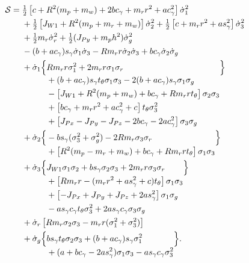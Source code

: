 \begin{align}
\mathcal S={}&\tfrac12\left[c+R^2(m_p+m_w)+2bc_\gamma+m_rr^2+ac_\gamma^2\right]\dot\sigma_1^2\\
&+\tfrac12\left[J_{W1}+R^2(m_p+m_r+m_w)\right]\dot\sigma_2^2
+\tfrac12\left[c+m_rr^2+as_\gamma^2\right]\dot\sigma_3^2\\
&+\tfrac12m_r\dot\sigma_r^2
+\tfrac12(J_{Py}+m_ph^2)\dot\sigma_g^2\\
&-(b+ac_\gamma)s_\gamma\dot\sigma_1\dot\sigma_3
-Rm_rr\dot\sigma_2\dot\sigma_3
+bc_\gamma\dot\sigma_2\dot\sigma_g\notag\\
&+\dot\sigma_1\Bigl\{\begin{aligned}[t]
&Rm_rr\sigma_1^2+2m_rr\sigma_1\sigma_r\\
&+(b+ac_\gamma)s_\gamma t_\theta\sigma_1\sigma_3
-2(b+ac_\gamma)s_\gamma\sigma_1\sigma_g\\
&-\left[J_{W1}+R^2(m_p+m_w)+bc_\gamma+Rm_rrt_\theta\right]\sigma_2\sigma_3\\
&+\left[bc_\gamma+m_rr^2+ac_\gamma^2+c\right]t_\theta\sigma_3^2\\
&+\left[J_{Px}-J_{Py}-J_{Pz}-2bc_\gamma-2ac_\gamma^2\right]\sigma_3\sigma_g
\end{aligned}\Bigr\}\notag\\
&+\dot\sigma_2\Bigl\{\begin{aligned}[t]
&-bs_\gamma(\sigma_3^2+\sigma_g^2)-2Rm_r\sigma_3\sigma_r\\
&+\left[R^2(m_p-m_r+m_w)+bc_\gamma+Rm_rrt_\theta\right]\sigma_1\sigma_3
\end{aligned}\Bigr\}\notag\\
&+\dot\sigma_3\Bigl\{\begin{aligned}[t]
&J_{W1}\sigma_1\sigma_2+bs_\gamma\sigma_2\sigma_3
+2m_rr\sigma_3\sigma_r\\
&+\left[Rm_rr-(m_rr^2+as_\gamma^2+c)t_\theta\right]\sigma_1\sigma_3\\
&+\left[-J_{Px}+J_{Py}+J_{Pz}+2as_\gamma^2\right]\sigma_1\sigma_g\\
&-as_\gamma c_\gamma t_\theta\sigma_3^2
+2as_\gamma c_\gamma\sigma_3\sigma_g
\end{aligned}\Bigr\}\notag\\
&+\dot\sigma_r\left[Rm_r\sigma_2\sigma_3-m_rr(\sigma_1^2+\sigma_3^2)\right]\notag\\
&+\dot\sigma_g\Bigl\{\begin{aligned}[t]
&bs_\gamma t_\theta\sigma_2\sigma_3
+(b+ac_\gamma)s_\gamma\sigma_1^2\\
&+(a+bc_\gamma-2as_\gamma^2)\sigma_1\sigma_3
-as_\gamma c_\gamma\sigma_3^2
\end{aligned}\Bigr\}.
\end{align}

